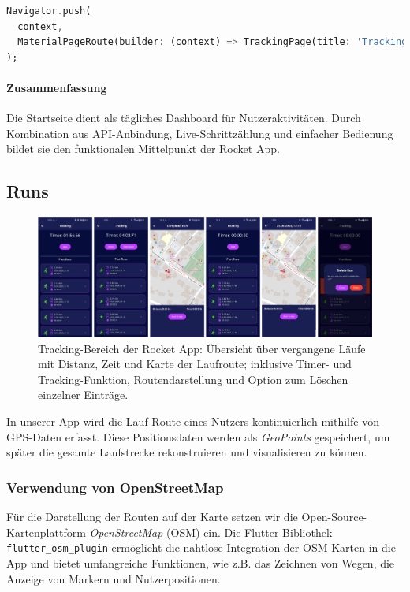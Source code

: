 \documentclass[11pt,a4paper]{article}
\begin{document}
\begin{lstlisting}[language=Dart, caption=Navigation zur Tracking-Seite]
Navigator.push(
  context,
  MaterialPageRoute(builder: (context) => TrackingPage(title: 'Tracking')),
);
\end{lstlisting}

\paragraph{Zusammenfassung}
Die Startseite dient als tägliches Dashboard für Nutzeraktivitäten. Durch Kombination aus API-Anbindung, Live-Schrittzählung und einfacher Bedienung bildet sie den funktionalen Mittelpunkt der Rocket App.

\subsection{Runs}

\begin{figure}[H]
    \centering
    \includegraphics[width=1\textwidth]{images/apps/run-pages.jpg}
    \caption{Tracking-Bereich der Rocket App: Übersicht über vergangene Läufe mit Distanz, Zeit und Karte der Laufroute; inklusive Timer- und Tracking-Funktion, Routendarstellung und Option zum Löschen einzelner Einträge.}
    \label{fig:validation-workflow}
\end{figure}

In unserer App wird die Lauf-Route eines Nutzers kontinuierlich mithilfe von GPS-Daten erfasst. Diese Positionsdaten werden als \textit{GeoPoints} gespeichert, um später die gesamte Laufstrecke rekonstruieren und visualisieren zu können.

\subsubsection{Verwendung von OpenStreetMap}

Für die Darstellung der Routen auf der Karte setzen wir die Open-Source-Kartenplattform \textit{OpenStreetMap} (OSM)\cite{openstreetmap} ein. Die Flutter-Bibliothek \texttt{flutter\_osm\_plugin}\cite{flutter_osm_plugin} ermöglicht die nahtlose Integration der OSM-Karten in die App und bietet umfangreiche Funktionen, wie z.B. das Zeichnen von Wegen, die Anzeige von Markern und Nutzerpositionen.
\end{document}
